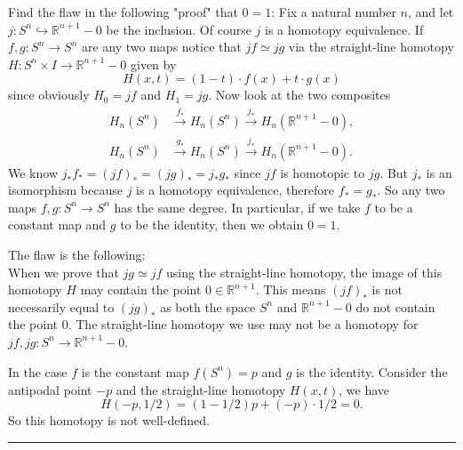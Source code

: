 \documentclass[a4paper, 12pt]{article}
\begin{document}
\begin{problem}{3}
Find the flaw in the following "proof" that \(0=1\):
Fix a natural number \(n\), and let \(j:S^n\hookrightarrow \mathbb{R}^{n+1}-0\) be the inclusion. Of course \(j\) is a homotopy equivalence. If \(f,g:S^n\rightarrow S^n\) are any two maps notice that \(jf\simeq jg \) via the straight-line 
homotopy \(H:S^n\times I\rightarrow \mathbb{R}^{n+1}-0\) given by 
\[H(x,t)=(1-t)\cdot f(x)+t\cdot g(x)\]
since obviously \(H_0=jf\) and \(H_1=jg\). Now look at the two composites 
\begin{align*}
    H_n(S^n)&\xrightarrow{f_*}H_n(S^n)\xrightarrow{j_*}H_n(\mathbb{R}^{n+1}-0),\\ 
    H_n(S^n)&\xrightarrow{g_*}H_n(S^n)\xrightarrow{j_*}H_n(\mathbb{R}^{n+1}-0).
\end{align*}
We know \(j_*f_*=(jf)_*=(jg)_*=j_*g_*\) since \(jf\) is homotopic to \(jg\). But \(j_*\) is an isomorphism because \(j\) is a homotopy equivalence, therefore \(f_*=g_*\). So any two maps \(f,g:S^n\rightarrow S^n\) has the same degree. 
In particular, if we take \(f\) to be a constant map and \(g\) to be the identity, then we obtain \(0=1\). 
\end{problem}
\begin{solution}
The flaw is the following:\\ 
When we prove that \(jg\simeq jf\) using the straight-line homotopy, the image of this homotopy \(H\) may contain the point \(0\in \mathbb{R}^{n+1}\). This means \((jf)_*\) is not necessarily equal to \((jg)_*\) as both the space \(S^n\) and 
\(\mathbb{R}^{n+1}-0\) do not contain the point \(0\). The straight-line homotopy we use may not be a homotopy for \(jf,jg:S^n\rightarrow \mathbb{R}^{n+1}-0\).

In the case \(f\) is the constant map \(f(S^n)=p\) and \(g\) is the identity. Consider the antipodal point \(-p\) and the straight-line homotopy \(H(x,t)\), we have 
\[H(-p,1/2)=(1-1/2)p+(-p)\cdot 1/2=0.\]
So this homotopy is not well-defined.
\end{solution}

\noindent\rule{7in}{2.8pt}
\end{document}
